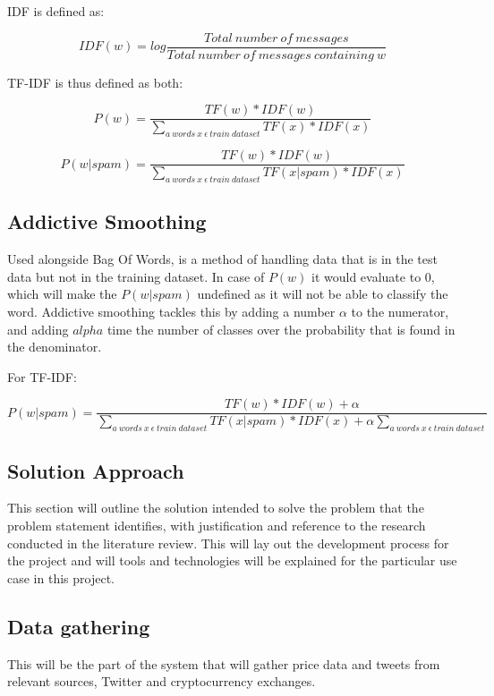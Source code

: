 \documentclass[oneside, 12pt]{article}
\begin{document}
			IDF is defined as:
			
			\[IDF(w) = log\frac{Total\ number\ of\ messages}{Total\ number\ of\ messages\ containing\ w}\]
			
			TF-IDF is thus defined as both:
			
			\[P(w) = \frac{TF(w)*IDF(w)}{\sum _{a\ words\ x\ \epsilon\ train\ dataset} TF(x)*IDF(x)}\]
			
			\[P(w|spam) = \frac{TF(w)*IDF(w)}{\sum _{a\ words\ x\ \epsilon\ train\ dataset} TF(x|spam)*IDF(x)}\]
				
			\cite{SpamCScratch}
			
			\subsection{Addictive Smoothing}
			Used alongside Bag Of Words, is a method of handling data that is in the test data but not in the training dataset. In case of $P(w)$ it would evaluate to 0, which will make the $P(w|spam)$ undefined as it will not be able to classify the word. Addictive smoothing tackles this by adding a number $\alpha$ to the numerator, and adding $alpha$ time the number of classes over the probability that is found in the denominator. \cite{SpamCScratch}
			\newline
			
			For TF-IDF:
			
			\[P(w|spam) = \frac{TF(w)*IDF(w) + \alpha}{\sum _{a\ words\ x\ \epsilon\ train\ dataset} TF(x|spam)*IDF(x) + \alpha\sum_{a\ words\ x\ \epsilon\ train\ dataset}}\]
		
	\newpage
	
	\begin{center}
		\section{Solution Approach}\label{solution}
	\end{center}
		This section will outline the solution intended to solve the problem that the problem statement identifies, with justification and reference to the research conducted in the literature review. This will lay out the development process for the project and will tools and technologies will be explained for the particular use case in this project.
		\newline
		
		\subsection{Data gathering}
		This will be the part of the system that will gather price data and tweets from relevant sources, Twitter and cryptocurrency exchanges.
		\newline
		
\end{document}

